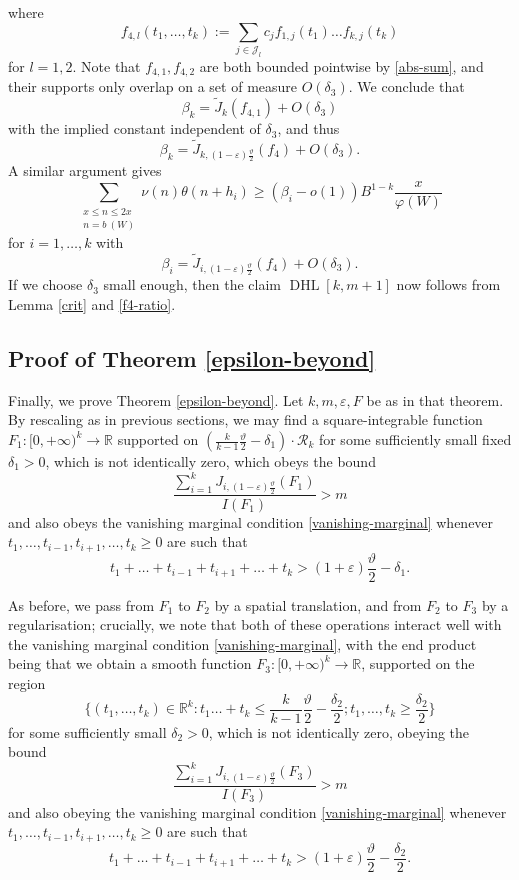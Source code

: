 \documentclass{bmcart}
\DeclareMathOperator*\DHL{DHL}
\theoremstyle{plain}
\theoremstyle{definition}
\newcommand\R{\mathbb{R}}
\newcommand\eps{\varepsilon}
\renewcommand{\phi}{\varphi}
\begin{document}
where
$$ f_{4,l}(t_1,\dots,t_k) :=\sum_{j \in {\mathcal J}_l} c_j f_{1,j}(t_1) \dots f_{k,j}(t_k)$$
for $l=1,2$.  Note that $f_{4,1}, f_{4,2}$ are both bounded pointwise by \eqref{abs-sum}, and their supports only overlap on a set of measure $O( \delta_3 )$.  We conclude that
$$ \beta_k = \tilde J_k( f_{4,1} ) + O(\delta_3)$$
with the implied constant independent of $\delta_3$, and thus
$$ \beta_k = \tilde J_{k, (1-\eps) \frac{\vartheta}{2}}( f_4 ) + O(\delta_3).$$
A similar argument gives
$$ 
 \sum_{\substack{x \leq n \leq 2x\\ n = b\ (W)}} \nu(n) \theta(n+h_i) \geq (\beta_i - o(1)) B^{1-k} \frac{x}{\phi(W)}$$
for $i=1,\dots,k$ with
$$ \beta_i = \tilde J_{i, (1-\eps) \frac{\vartheta}{2}}( f_4 ) + O(\delta_3).$$
If we choose $\delta_3$ small enough, then the claim $\DHL[k,m+1]$ now follows from Lemma \ref{crit} and \eqref{f4-ratio}.

\subsection{Proof of Theorem \ref{epsilon-beyond}}\label{beyond-sec}

Finally, we prove Theorem \ref{epsilon-beyond}. Let $k, m, \eps, F$ be as in that theorem.  By rescaling as in previous sections, we may find
a square-integrable function $F_1: [0,+\infty)^k \to \R$ supported on 
$(\frac{k}{k-1} \frac{\vartheta}{2}-\delta_1) \cdot {\mathcal R}_k$ for some sufficiently small fixed $\delta_1 > 0$, which is not identically zero, which obeys the bound
$$
\frac{\sum_{i=1}^k J_{i,(1-\eps) \frac{\vartheta}{2}}(F_1)}{I(F_1)} > m
$$
and also obeys the vanishing marginal condition \eqref{vanishing-marginal} whenever $t_1,\dots,t_{i-1},t_{i+1},\dots,t_k \geq 0$ are such that
$$ t_1+\dots+t_{i-1}+t_{i+1}+\dots+t_k > (1+\eps) \frac{\vartheta}{2} - \delta_1.$$

As before, we pass from $F_1$ to $F_2$ by a spatial translation, and from $F_2$ to $F_3$ by a regularisation; crucially, we note that both of these operations interact well with the vanishing marginal condition \eqref{vanishing-marginal}, with the end product being that we obtain a smooth function $F_3: [0,+\infty)^k \to \R$, supported on the region
$$
\{ (t_1,\dots,t_k) \in \R^k: t_1 \dots + t_k \leq \frac{k}{k-1} \frac{\vartheta}{2}-\frac{\delta_2}{2}; t_1,\dots,t_k \geq \frac{\delta_2}{2} \}$$
for some sufficiently small $\delta_2>0$, which is not identically zero, obeying the bound
$$
\frac{\sum_{i=1}^k J_{i,(1-\eps) \frac{\vartheta}{2}}(F_3)}{I(F_3)} > m
$$
and also obeying the vanishing marginal condition \eqref{vanishing-marginal} whenever
$t_1,\dots,t_{i-1},t_{i+1},\dots,t_k \geq 0$ are such that
$$ t_1+\dots+t_{i-1}+t_{i+1}+\dots+t_k > (1+\eps) \frac{\vartheta}{2} - \frac{\delta_2}{2}.$$
\end{document}
